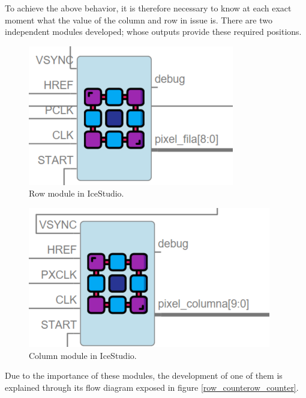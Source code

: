 To achieve the above behavior, it is therefore necessary to know at each exact moment what the value of the column and row in issue is.\newline
There are two independent modules developed; whose outputs provide these required positions.
	
	\begin{figure}[H]
		\center
		\includegraphics[scale=0.6, angle=0]{imagenes/Cuadricoptero_vision/filas_module}
		\caption{Row module in IceStudio.}
		\label{fig:filas_module}
	\end{figure}
	
	\begin{figure}[H]
		\center
		\includegraphics[scale=0.6, angle=0]{imagenes/Cuadricoptero_vision/columnas_module}
		\caption{Column module in IceStudio.}
		\label{fig:columnas_module}
	\end{figure}
	

	Due to the importance of these modules, the development of one of them is explained through its flow diagram exposed in figure \ref{row_counterow_counter}.
	
